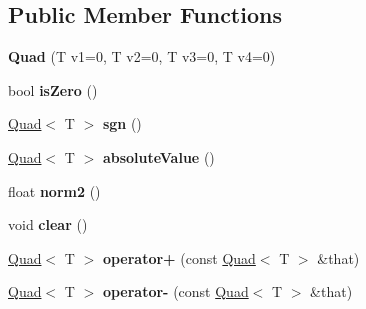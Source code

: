 \subsection*{Public Member Functions}
\begin{DoxyCompactItemize}
\item 
\hypertarget{classfirestep_1_1_quad_ad4a5fe8b71084308636c549ed9139b62}{{\bfseries Quad} (T v1=0, T v2=0, T v3=0, T v4=0)}\label{classfirestep_1_1_quad_ad4a5fe8b71084308636c549ed9139b62}

\item 
\hypertarget{classfirestep_1_1_quad_a0df9f8f9f5f01600bca23a5ece1d7f93}{bool {\bfseries is\+Zero} ()}\label{classfirestep_1_1_quad_a0df9f8f9f5f01600bca23a5ece1d7f93}

\item 
\hypertarget{classfirestep_1_1_quad_a18c27f35b1e58bb9d7fa41f2d33e1778}{\hyperlink{classfirestep_1_1_quad}{Quad}$<$ T $>$ {\bfseries sgn} ()}\label{classfirestep_1_1_quad_a18c27f35b1e58bb9d7fa41f2d33e1778}

\item 
\hypertarget{classfirestep_1_1_quad_ae51176822861d549a29b5ceac77770ab}{\hyperlink{classfirestep_1_1_quad}{Quad}$<$ T $>$ {\bfseries absolute\+Value} ()}\label{classfirestep_1_1_quad_ae51176822861d549a29b5ceac77770ab}

\item 
\hypertarget{classfirestep_1_1_quad_a6e51be6ab5dfd2114f2726562934207e}{float {\bfseries norm2} ()}\label{classfirestep_1_1_quad_a6e51be6ab5dfd2114f2726562934207e}

\item 
\hypertarget{classfirestep_1_1_quad_a35a4acb760021be2709db0eb46973c8c}{void {\bfseries clear} ()}\label{classfirestep_1_1_quad_a35a4acb760021be2709db0eb46973c8c}

\item 
\hypertarget{classfirestep_1_1_quad_a04bf97b01c806383da66b2faaed1e61a}{\hyperlink{classfirestep_1_1_quad}{Quad}$<$ T $>$ {\bfseries operator+} (const \hyperlink{classfirestep_1_1_quad}{Quad}$<$ T $>$ \&that)}\label{classfirestep_1_1_quad_a04bf97b01c806383da66b2faaed1e61a}

\item 
\hypertarget{classfirestep_1_1_quad_a1db197c5eff89aa649ab149665ea8a66}{\hyperlink{classfirestep_1_1_quad}{Quad}$<$ T $>$ {\bfseries operator-\/} (const \hyperlink{classfirestep_1_1_quad}{Quad}$<$ T $>$ \&that)}\label{classfirestep_1_1_quad_a1db197c5eff89aa649ab149665ea8a66}


\end{DoxyCompactItemize}
